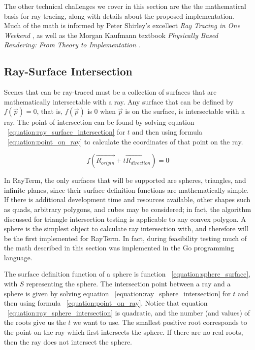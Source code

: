 \documentclass[11pt]{article}
\def\widow#1{\vskip #1\vbadness10000\penalty-200\vskip-#1}
\def\littlesection#1{
  \widow{2cm}
  \vskip 0.5cm
  \noindent{\bf #1}
  \vskip 0.0001cm
}
\newcommand{\name}{{\sc RayTerm}}
\newcommand{\rayorg}{\vec{R_{origin}}}
\newcommand{\raydir}{\vec{R_{direction}}}
\begin{document}
The other technical challenges we cover in this section are the the mathematical basis for ray-tracing, along with details about the proposed implementation.
Much of the math is informed by Peter Shirley's excellect {\it Ray Tracing in One Weekend} \cite{shirley2016ray}, as well as the Morgan Kaufmann textbook {\it Physically Based Rendering: From Theory to Implementation} \cite{pharr2016physically}.


\subsection{Ray-Surface Intersection}

Scenes that can be ray-traced must be a collection of surfaces that are mathematically intersectable with a ray.
Any surface that can be defined by $f(\vec{p}) = 0$, that is, $f(\vec{p})$ is $0$ when $\vec{p}$ is on the surface, is intersectable with a ray.
The point of intersection can be found by solving equation ~\ref{equation:ray_surface_intersection} for $t$ and then using formula ~\ref{equation:point_on_ray} to calculate the coordinates of that point on the ray.

\begin{equation}
  \label{equation:ray_surface_intersection}
  f(\rayorg + t\raydir) = 0
\end{equation}

In \name, the only surfaces that will be supported are spheres, triangles, and infinite planes, since their surface definition functions are mathematically simple.
If there is additional development time and resources available, other shapes such as quads, arbitrary polygons, and cubes may be considered; in fact, the algorithm discussed for triangle intersection testing is applicable to any convex polygon.
A sphere is the simplest object to calculate ray intersection with, and therefore will be the first implemented for \name.
In fact, during feasibility testing much of the math described in this section was implemented in the Go programming language.

\littlesection{Ray-Sphere Intersection}

The surface definition function of a sphere is function ~\ref{equation:sphere_surface}, with $S$ representing the sphere.
The intersection point between a ray and a sphere is given by solving equation ~\ref{equation:ray_sphere_intersection} for $t$ and then using formula ~\ref{equation:point_on_ray}.
Notice that equation ~\ref{equation:ray_sphere_intersection} is quadratic, and the number (and values) of the roots give us the $t$ we want to use.
The smallest positive root corresponds to the point on the ray which first intersects the sphere.
If there are no real roots, then the ray does not intersect the sphere.
\end{document}
